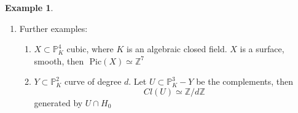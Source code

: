 \documentclass[11pt]{article}
\theoremstyle{definition}
\newtheorem{ex}[thm]{Example}
\newcommand{\pic}{\text{ Pic}}
\newcommand{\proj}{\mathbb P}
\newcommand{\intg}{\mathbb Z}
\renewcommand{\div}{\textnormal{div}}
\newcommand{\Lrta}{\Longrightarrow}
\newcommand{\lrta}{\longrightarrow}
\begin{document}
\begin{ex}
\begin{enumerate}[label=(\arabic*)]
\begin{proof}
\begin{enumerate}[label=(\alph*)]
$\Lrta$
$$
\begin{aligned}
\underline{deg}(\div(f))&=\sum n_i \underline{deg}(D_i-\sum m_j \underline{deg}(E_j)\\ 
&(\underline{deg}(D_i)=deg(h_i),\underline{deg}(E_j)=deg(k_j))\\
&=deg(g_1)-deg(g_2)=0.
\end{aligned}
$$
Then we come back to prove the \underline{Key fact}:
$$
f_1=\sum_{\underline{d}}\alpha_{\underline{d}} \left(\frac{X_0}{X_0}\right)^{d_0}\cdots \left(\frac{X_n}{X_0}\right)^{d_n}
$$
e.g.
$$
\begin{aligned}
&\left(\frac{X_1}{X_0}\right)^{2}+37 \left(\frac{X_1}{X_0}\right)^{3}\left(\frac{X_2}{X_0}\right)\\
&=\frac{X_0^2X_1^2+37X_1^3X_2}{X_0^4}\\
&=\frac{1}{X_0^{deg f_1}}\sum_{\underline{d}}\alpha_{\underline{d}} X_0^{deg f_1-\sum_{i=1}^n d_i} X_1^{}d_1\cdots X_n^{d_n}\\
&=\frac{\text{homogeneous degree $deg f_1$}}{X_0^{deg f_1}}\\
\end{aligned}
$$
$$
\Lrta f_2=\frac{\text{homogeneous degree $deg f_2$}}{X_0^{deg f_2}}\\
$$
$$
\Lrta \frac{f_1}{f_2}=\frac{X_0^{ deg f_1}(deg f_1)}{(deg f_2) X_0^{deg f_1}}
$$

\item $\underline{deg}: Cl(X)\lrta \intg$ is surjective because $\underline{deg}(D_0)=1$, $D_0$ associated to $X_0$ and injective because if $deg(D)=0$ write $D=D_1-D_2$ with $D_1,D_2$ effective then $\underline{deg}(D_1)=\underline{deg}(D_2)$. Write 
$D_1=\sum n_i E_i$, where $E_i$ is prime divisors associated to $h_i$. 
$D_2=\sum m_j F_j$, where $F_j$ is prime divisors associated to $k_j$. 


Then let $f=\prod h_i ^{n_i}\prod k_j^{- m_j}\in K(X)^\times$, and as shown above $\div(f)=D_1-D_2=D$ so $D$ is  $0$ in $Cl(X)$.
\item the proof can be found in Hartshorne
\end{enumerate}
\end{proof}
\item Further examples: 
\begin{enumerate}[label=(\alph*)]
\item $X\subset \proj^4_K$ cubic, where $K$ is an algebraic closed field. $X$ is a  surface, smooth, then $\pic(X)\simeq \intg^7$
\item $Y\subset \proj^2_K$ curve of degree $d$. Let $U\subset \proj^3_K-Y$ be the complements, then 
$$
Cl(U)\simeq \intg/d\intg
$$
generated by $U\cap H_0$
\end{enumerate}
\end{enumerate}
\end{ex}
\end{document}
